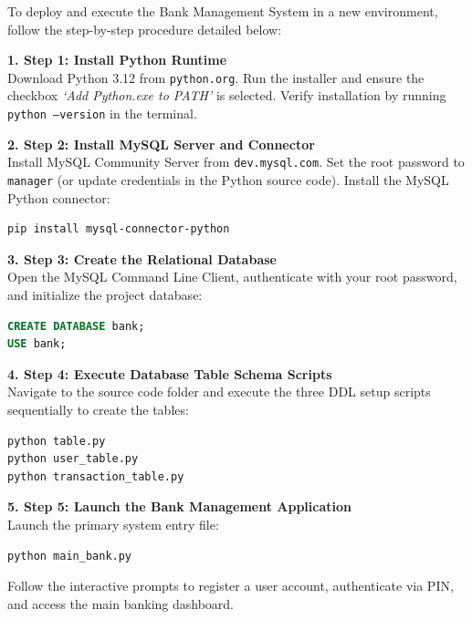 \documentclass[12pt,a4paper]{article}
\begin{document}
To deploy and execute the Bank Management System in a new environment, follow the step-by-step procedure detailed below:

\vspace{0.6em}
\noindent\textbf{1. Step 1: Install Python Runtime} \\
Download Python 3.12 from \texttt{python.org}. Run the installer and ensure the checkbox \textit{`Add Python.exe to PATH'} is selected. Verify installation by running \texttt{python --version} in the terminal.

\vspace{0.6em}
\noindent\textbf{2. Step 2: Install MySQL Server and Connector} \\
Install MySQL Community Server from \texttt{dev.mysql.com}. Set the root password to \texttt{manager} (or update credentials in the Python source code). Install the MySQL Python connector:
\begin{lstlisting}[language=bash]
pip install mysql-connector-python
\end{lstlisting}

\noindent\textbf{3. Step 3: Create the Relational Database} \\
Open the MySQL Command Line Client, authenticate with your root password, and initialize the project database:
\begin{lstlisting}[language=SQL]
CREATE DATABASE bank;
USE bank;
\end{lstlisting}

\noindent\textbf{4. Step 4: Execute Database Table Schema Scripts} \\
Navigate to the source code folder and execute the three DDL setup scripts sequentially to create the tables:
\begin{lstlisting}[language=bash]
python table.py
python user_table.py
python transaction_table.py
\end{lstlisting}

\noindent\textbf{5. Step 5: Launch the Bank Management Application} \\
Launch the primary system entry file:
\begin{lstlisting}[language=bash]
python main_bank.py
\end{lstlisting}
Follow the interactive prompts to register a user account, authenticate via PIN, and access the main banking dashboard.

\clearpage

\hypertarget{sec:bibliography}{}\label{sec:bibliography}
\end{document}
